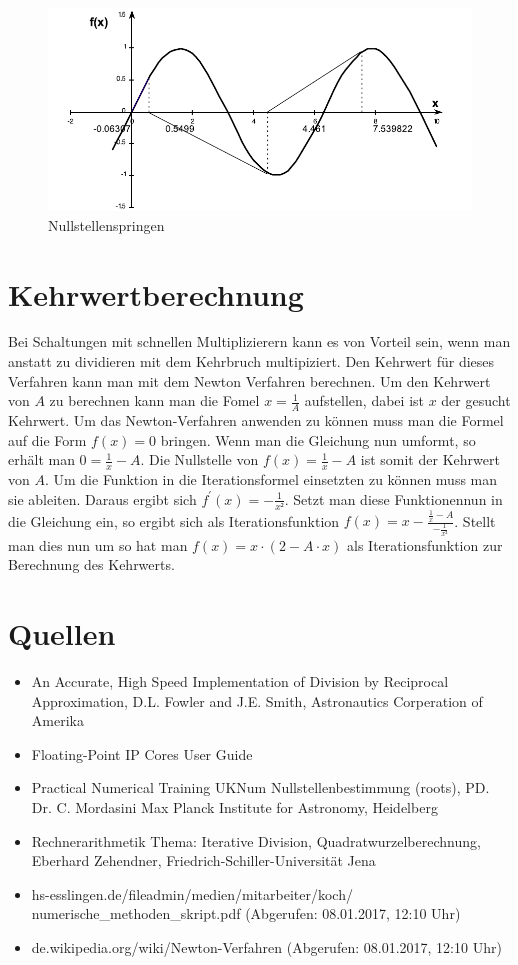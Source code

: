 \documentclass[a4paper,12pt,fleqn,oneside]{article}
\begin{document}
		\begin{figure}
			\centering
			\includegraphics[width=0.5\linewidth]{hupfen.png}
			\caption{Nullstellenspringen}
			\label{fig:hupfen}
		\end{figure}

\newpage

\section{Kehrwertberechnung}

	Bei Schaltungen mit schnellen Multiplizierern kann es von Vorteil sein, wenn man anstatt zu dividieren mit dem Kehrbruch multipiziert. Den Kehrwert
	für dieses Verfahren kann man mit dem Newton Verfahren berechnen. Um den Kehrwert von $A$ zu berechnen kann man die Fomel $x = \frac{1}{A}$
	aufstellen, dabei ist $x$ der gesucht Kehrwert. Um das Newton-Verfahren anwenden zu können muss man die Formel auf die Form $f(x) = 0$ bringen.
	Wenn man die Gleichung nun umformt, so erhält man $0 = \frac{1}{x} - A$. Die Nullstelle von $f(x) = \frac{1}{x} - A$ ist somit der Kehrwert von $A$.
	Um die Funktion in die Iterationsformel einsetzten zu können muss man sie ableiten. Daraus ergibt sich $f^\prime(x) = -\frac{1}{x²}$. Setzt man diese
	Funktionennun in die Gleichung ein, so ergibt sich als Iterationsfunktion $f(x) = x- \frac{\frac{1}{x} - A}{-\frac{1}{x²}}$. Stellt man dies nun um so hat
	man $f(x) = x \cdot (2 - A \cdot x)$ als Iterationsfunktion zur Berechnung des Kehrwerts.

\newpage

\section{Quellen}
	\begin{itemize}
		\item An Accurate, High Speed Implementation of Division by Reciprocal Approximation, D.L. Fowler and J.E. Smith, Astronautics Corperation of
			Amerika
		\item Floating-Point IP Cores User Guide
		\item Practical Numerical Training UKNum Nullstellenbestimmung (roots), PD. Dr. C. Mordasini Max Planck Institute for Astronomy, Heidelberg
		\item Rechnerarithmetik Thema: Iterative Division, Quadratwurzelberechnung, Eberhard Zehendner, Friedrich-Schiller-Universität Jena
		\item hs-esslingen.de/fileadmin/medien/mitarbeiter/koch/\\numerische\_methoden\_skript.pdf (Abgerufen: 08.01.2017, 12:10 Uhr)
		\item de.wikipedia.org/wiki/Newton-Verfahren (Abgerufen: 08.01.2017, 12:10 Uhr)
	\end{itemize}
\end{document}
